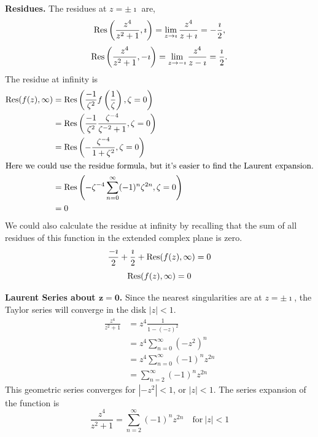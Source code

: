 {\begin{Solution}
  \textbf{Residues.}
  The residues at $z = \pm \imath$ are,
  \[
  \mathop{\mathrm{Res}}\nolimits \left( \frac{ z^4 }{ z^2 + 1 }, \imath \right)
  = \lim_{z \to \imath} \frac{ z^4 }{ z + \imath }
  = - \frac{ \imath }{ 2 },
  \]
  \[
  \mathop{\mathrm{Res}}\nolimits \left( \frac{ z^4 }{ z^2 + 1 }, -\imath \right)
  = \lim_{z \to -\imath} \frac{ z^4 }{ z - \imath }
  = \frac{ \imath }{ 2 }.
  \]
  The residue at infinity is
  \begin{align*}
    \mathop{\mathrm{Res}}\nolimits ( f(z), \infty )
    &= \mathop{\mathrm{Res}}\nolimits \left( \frac{-1}{\zeta^2} f \left( \frac{1}{\zeta} \right),
      \zeta = 0 \right) \\
    &= \mathop{\mathrm{Res}}\nolimits \left( \frac{-1}{\zeta^2} \frac{\zeta^{-4}}{\zeta^{-2} + 1},
      \zeta = 0 \right) \\
    &= \mathop{\mathrm{Res}}\nolimits \left( - \frac{\zeta^{-4}}{1 + \zeta^2}, \zeta = 0 \right) \\
    \intertext{Here we could use the residue formula, but it's easier to find
      the Laurent expansion.}
    &= \mathop{\mathrm{Res}}\nolimits \left( - \zeta^{-4} \sum_{n = 0}^\infty (-1)^n \zeta^{2n},
      \zeta = 0 \right) \\
    &= 0
  \end{align*}
  We could also calculate the residue at infinity by recalling that the sum
  of all residues of this function in the extended complex plane is zero.
  \[
  \frac{-\imath}{2} + \frac{\imath}{2} + \mathop{\mathrm{Res}}\nolimits(f(z),\infty) = 0
  \]
  \[
  \mathop{\mathrm{Res}}\nolimits(f(z),\infty) = 0
  \]

  \textbf{Laurent Series about $\mathbf{z = 0}$.}
  Since the nearest singularities are at $z = \pm \imath$, the Taylor series will
  converge in the disk $|z| < 1$.
  \begin{align*}
    \frac{z^4}{z^2 + 1}
    &= z^4 \frac{1}{1 - (-z)^2} \\
    &= z^4 \sum_{n = 0}^\infty (-z^2)^n \\
    &= z^4 \sum_{n = 0}^\infty (-1)^n z^{2n} \\
    &= \sum_{n = 2}^\infty (-1)^n z^{2n}
  \end{align*}
  This geometric series converges for $|-z^2| < 1$, or $|z| < 1$.
  The series expansion of the function is
  \[
  \boxed{
    \frac{z^4}{z^2+1} = \sum_{n=2}^\infty (-1)^n z^{2n} \quad \mathrm{for}\ |z|<1
    }
  \]


\end{Solution}}
